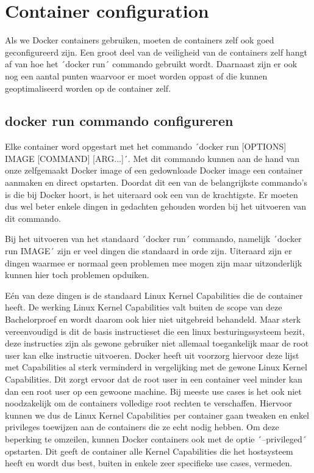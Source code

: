 \section{Container configuration}

Als we Docker containers gebruiken, moeten de containers zelf ook goed geconfigureerd zijn. Een groot deel van de veiligheid van de containers zelf hangt af van hoe het ´docker run´ commando gebruikt wordt. Daarnaast zijn er ook nog een aantal punten waarvoor er moet worden oppast of die kunnen geoptimaliseerd worden op de container zelf.

\subsection{docker run commando configureren}

Elke container word opgestart met het commando ´docker run [OPTIONS] IMAGE [COMMAND] [ARG...]´. Met dit commando kunnen aan de hand van onze zelfgemaakt Docker image of een gedownloade Docker image een container aanmaken en direct opstarten. Doordat dit een van de belangrijkste commando's is die bij Docker hoort, is het uiteraard ook een van de krachtigste. Er moeten dus wel beter  enkele dingen in gedachten gehouden worden bij het uitvoeren van dit commando.

Bij het uitvoeren van het standaard ´docker run´ commando, namelijk ´docker run IMAGE´ zijn er veel dingen die standaard in orde zijn. Uiteraard zijn er dingen waarmee er normaal geen problemen mee mogen zijn maar uitzonderlijk kunnen hier toch problemen opduiken.

Eén van deze dingen is de standaard Linux Kernel Capabilities die de container heeft. De werking Linux Kernel Capabilities valt buiten de scope van deze Bachelorproef en wordt daarom ook hier niet uitgebreid behandeld. Maar sterk vereenvoudigd is dit de basis instructieset die een linux besturingssysteem bezit, deze instructies zijn als gewone gebruiker niet allemaal toegankelijk maar de root user kan elke instructie uitvoeren. Docker heeft uit voorzorg hiervoor deze lijst met Capabilities al sterk verminderd in vergelijking met de gewone Linux Kernel Capabilities. Dit zorgt ervoor dat de root user in een container veel minder kan dan een root user op een gewoone machine. Bij meeste use cases is het ook niet noodzakelijk om de containers volledige root rechten te verschaffen. Hiervoor kunnen we dus de Linux Kernel Capabilities per container gaan tweaken en enkel privileges toewijzen aan de containers die ze echt nodig hebben. Om deze beperking te omzeilen, kunnen Docker containers ook met de optie ´--privileged´ opstarten. Dit geeft de container alle Kernel Capabilities die het hostsysteem heeft en wordt dus best, buiten in enkele zeer specifieke use cases, vermeden.

